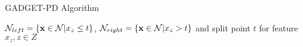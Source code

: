 \documentclass[11pt,compress,t,notes=noshow, aspectratio=169, xcolor=table,dvipsnames]{beamer}
\begin{document}
\begin{frame}{GADGET-PD Algorithm}
\begin{itemize}
    $\mathcal{N}_{left} = \{\mathbf{x} \in \mathcal{N}|x_z \leq t\}$, $\mathcal{N}_{right} = \{\mathbf{x} \in \mathcal{N}|x_z > t\}$ and split point $t$ for feature $x_z, z \in Z$
    
\end{itemize}
    
\end{frame}
\end{document}
